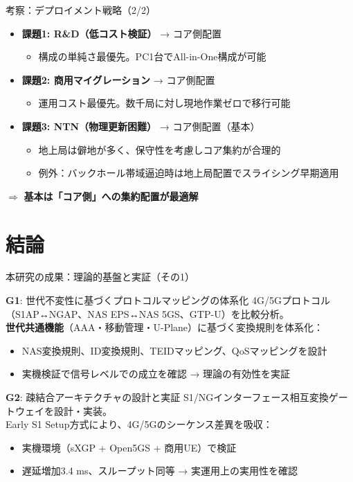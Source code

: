\documentclass[dvipdfmx,11pt,aspectratio=169]{beamer}
\begin{document}
\begin{frame}{考察：デプロイメント戦略（2/2）}
  \begin{itemize}
    \item \textbf{課題1: R\&D（低コスト検証）} → \alert{コア側配置}
      \begin{itemize}
        \item 構成の単純さ最優先。PC1台でAll-in-One構成が可能
      \end{itemize}
    \item \textbf{課題2: 商用マイグレーション} → \alert{コア側配置}
      \begin{itemize}
        \item 運用コスト最優先。数千局に対し現地作業ゼロで移行可能
      \end{itemize}
    \item \textbf{課題3: NTN（物理更新困難）} → \alert{コア側配置}（基本）
      \begin{itemize}
        \item 地上局は僻地が多く、保守性を考慮しコア集約が合理的
        \item 例外：バックホール帯域逼迫時は地上局配置でスライシング早期適用
      \end{itemize}
  \end{itemize}
  \vspace{0.5em}
  $\Rightarrow$ \textbf{基本は「コア側」への集約配置が最適解}
\end{frame}

\section{結論}
\begin{frame}{本研究の成果：理論的基盤と実証（その1）}
  \begin{block}{\textbf{G1}: 世代不変性に基づくプロトコルマッピングの体系化}
    4G/5Gプロトコル（S1AP↔NGAP、NAS EPS↔NAS 5GS、GTP-U）を比較分析。\\
    \textbf{世代共通機能}（AAA・移動管理・U-Plane）に基づく変換規則を体系化：
    \begin{itemize}
      \small
      \item NAS変換規則、ID変換規則、TEIDマッピング、QoSマッピングを設計
      \item 実機検証で信号レベルでの成立を確認 → 理論の有効性を実証
    \end{itemize}
  \end{block}

  \begin{block}{\textbf{G2}: 疎結合アーキテクチャの設計と実証}
    S1/NGインターフェース相互変換ゲートウェイを設計・実装。\\
    Early S1 Setup方式により、4G/5Gのシーケンス差異を吸収：
    \begin{itemize}
      \small
      \item 実機環境（sXGP + Open5GS + 商用UE）で検証
      \item 遅延増加3.4 ms、スループット同等 → 実運用上の実用性を確認
    \end{itemize}
  \end{block}
\end{frame}
\end{document}
